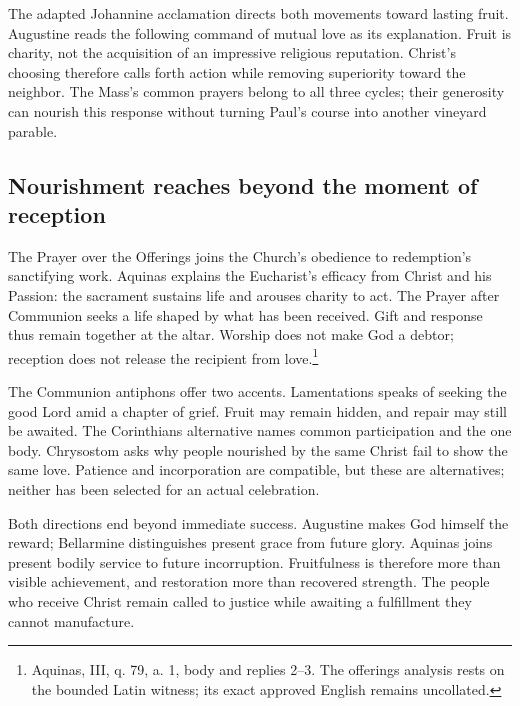 The adapted Johannine acclamation directs both movements toward lasting fruit. Augustine reads the following command of mutual love as its explanation. Fruit is charity, not the acquisition of an impressive religious reputation. Christ's choosing therefore calls forth action while removing superiority toward the neighbor. The Mass's common prayers belong to all three cycles; their generosity can nourish this response without turning Paul's course into another vineyard parable.

\subsection{Nourishment reaches beyond the moment of reception}
The Prayer over the Offerings joins the Church's obedience to redemption's sanctifying work. Aquinas explains the Eucharist's efficacy from Christ and his Passion: the sacrament sustains life and arouses charity to act. The Prayer after Communion seeks a life shaped by what has been received. Gift and response thus remain together at the altar. Worship does not make God a debtor; reception does not release the recipient from love.\footnote{Aquinas,  III, q. 79, a. 1, body and replies 2--3. The offerings analysis rests on the bounded Latin witness; its exact approved English remains uncollated.}

The Communion antiphons offer two accents. Lamentations speaks of seeking the good Lord amid a chapter of grief. Fruit may remain hidden, and repair may still be awaited. The Corinthians alternative names common participation and the one body. Chrysostom asks why people nourished by the same Christ fail to show the same love. Patience and incorporation are compatible, but these are alternatives; neither has been selected for an actual celebration.

Both directions end beyond immediate success. Augustine makes God himself the reward; Bellarmine distinguishes present grace from future glory. Aquinas joins present bodily service to future incorruption. Fruitfulness is therefore more than visible achievement, and restoration more than recovered strength. The people who receive Christ remain called to justice while awaiting a fulfillment they cannot manufacture.
